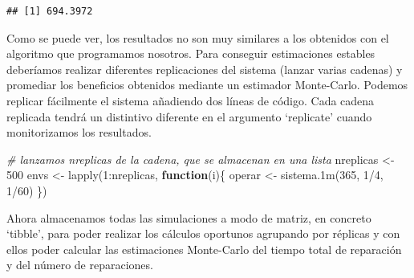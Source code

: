 \documentclass[
]{book}
\newenvironment{Shaded}{\begin{snugshade}}{\end{snugshade}}
\newcommand{\CommentTok}[1]{\textcolor[rgb]{0.56,0.35,0.01}{\textit{#1}}}
\newcommand{\ControlFlowTok}[1]{\textcolor[rgb]{0.13,0.29,0.53}{\textbf{#1}}}
\newcommand{\DecValTok}[1]{\textcolor[rgb]{0.00,0.00,0.81}{#1}}
\newcommand{\FunctionTok}[1]{\textcolor[rgb]{0.00,0.00,0.00}{#1}}
\newcommand{\NormalTok}[1]{#1}
\newcommand{\OtherTok}[1]{\textcolor[rgb]{0.56,0.35,0.01}{#1}}
\newcommand{\SpecialCharTok}[1]{\textcolor[rgb]{0.00,0.00,0.00}{#1}}
\theoremstyle{definition}
\theoremstyle{definition}
\theoremstyle{definition}
\theoremstyle{definition}
\theoremstyle{remark}
\begin{document}
\begin{verbatim}
## [1] 694.3972
\end{verbatim}

Como se puede ver, los resultados no son muy similares a los obtenidos con el algoritmo que programamos nosotros. Para conseguir estimaciones estables deberíamos realizar diferentes replicaciones del sistema (lanzar varias cadenas) y promediar los beneficios obtenidos mediante un estimador Monte-Carlo. Podemos replicar fácilmente el sistema añadiendo dos líneas de código. Cada cadena replicada tendrá un distintivo diferente en el argumento `replicate' cuando monitorizamos los resultados.

\begin{Shaded}
\begin{Highlighting}[]
\CommentTok{\# lanzamos \textquotesingle{}nreplicas\textquotesingle{} de la cadena, que se almacenan en una lista}
\NormalTok{nreplicas }\OtherTok{\textless{}{-}} \DecValTok{500}
\NormalTok{envs }\OtherTok{\textless{}{-}} \FunctionTok{lapply}\NormalTok{(}\DecValTok{1}\SpecialCharTok{:}\NormalTok{nreplicas, }\ControlFlowTok{function}\NormalTok{(i)\{}
\NormalTok{  operar }\OtherTok{\textless{}{-}} \FunctionTok{sistema.1m}\NormalTok{(}\DecValTok{365}\NormalTok{, }\DecValTok{1}\SpecialCharTok{/}\DecValTok{4}\NormalTok{, }\DecValTok{1}\SpecialCharTok{/}\DecValTok{60}\NormalTok{)}
\NormalTok{\})}
\end{Highlighting}
\end{Shaded}

Ahora almacenamos todas las simulaciones a modo de matriz, en concreto `tibble', para poder realizar los cálculos oportunos agrupando por réplicas y con ellos poder calcular las estimaciones Monte-Carlo del tiempo total de reparación y del número de reparaciones.
\end{document}
